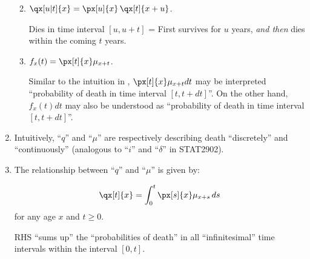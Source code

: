 \begin{enumerate}
\begin{proposition}
\begin{enumerate}
\begin{intuition}
\end{intuition}
\item \(\qx[u|t]{x}=\px[u]{x}\,\qx[t]{x+u}\).
\begin{intuition}
Dies in time interval \([u, u+t]\) = First survives for \(u\) years, \emph{and then}
dies within the coming \(t\) years.
\end{intuition}
\item \(f_x(t)=\px[t]{x}\mu_{x+t}\).
\begin{intuition}
Similar to the intuition in , \(\px[t]{x}\mu_{x+t}dt\) may be
interpreted ``probability of death in time interval \([t,t+dt]\)''. On the
other hand, \(f_x(t)dt\) may also be understood as ``probability of death in
time interval \([t,t+dt]\)''.
\end{intuition}
\end{enumerate}
\end{proposition}

\item Intuitively, ``\(q\)'' and ``\(\mu\)'' are respectively describing death
``discretely'' and ``continuously'' (analogous to ``\(i\)'' and ``\(\delta\)''
in STAT2902).

\item The relationship between ``\(q\)'' and ``\(\mu\)'' is given by:
\begin{proposition}
\label{prp:qx-int}
\[
\qx[t]{x}=\int_{0}^{t}\px[s]{x}\mu_{x+s}\,ds
\]
for any age \(x\) and \(t\ge 0\).

\begin{intuition}
RHS ``sums up'' the ``probabilities of death'' in all ``infinitesimal'' time
intervals within the interval \([0,t]\).
\end{intuition}
\end{proposition}
\end{enumerate}

